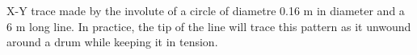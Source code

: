 \label{fig:spiral} X-Y trace made by the involute of a circle of diametre 0.16 m in diameter and a 6 m long line. In practice, the tip of the line will trace this pattern as it unwound around a drum while keeping it in tension.
